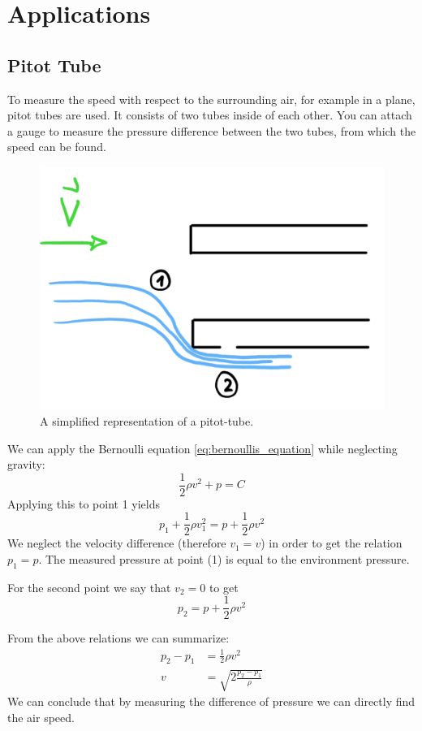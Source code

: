 \section{Applications}
\subsection{Pitot Tube}
To measure the speed with respect to the surrounding air, for example in a plane, pitot tubes are used. It consists of two tubes inside of each other. You can attach a gauge to measure the pressure difference between the two tubes, from which the speed can be found.
\begin{figure}[H]
	\centering
	\includegraphics[width=0.4\linewidth]{Sketches/pitot_tube}
	\caption{A simplified representation of a pitot-tube.}
	\label{fig:pitottube}
\end{figure}

We can apply the Bernoulli equation \eqref{eq:bernoullis_equation} while neglecting gravity:
\begin{equation*}
	\frac 12\rho v^2+ p = C
\end{equation*}
Applying this to point 1 yields
\begin{equation*}
	p_1+\frac 12\rho v_1^2 = p+\frac 12 \rho v^2
\end{equation*}
We neglect the velocity difference (therefore $v_1=v$) in order to get the relation $p_1=p$. The measured pressure at point (1) is equal to the environment pressure.

For the second point we say that $v_2=0$ to get
\begin{equation*}
	p_2 = p + \frac 12 \rho v^2 
\end{equation*}

From the above relations we can summarize:
\begin{equation*}
	\begin{split}
		 p_2-p_1&=\frac 12 \rho v^2\\
		 v&=\sqrt{2\frac{p_2-p_1}\rho}
	\end{split}
\end{equation*}
We can conclude that by measuring the difference of pressure we can directly find the air speed.

